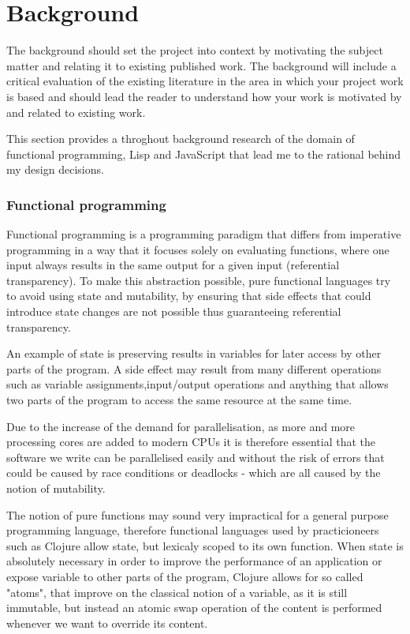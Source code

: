 \chapter{Background}
The background should set the project into context by motivating the subject matter and relating it to existing published work. The background will include a critical evaluation of the existing literature in the area in which your project work is based and should lead the reader to understand how your work is motivated by and related to existing work.

This section provides a throghout background research of the domain of functional programming, Lisp and JavaScript that lead me to the rational behind my design decisions.

\subsection{Functional programming}
Functional programming is a programming paradigm that differs from imperative programming in a way that it focuses solely on evaluating functions, where one input always results in the same output for a given input (referential transparency). To make this abstraction possible, pure functional languages try to avoid using state and mutability, by ensuring that side effects that could introduce state changes are not possible thus guaranteeing referential transparency.

An example of state is preserving results in variables for later access by other parts of the program. A side effect may result from many different operations such as variable assignments,input/output operations and anything that allows two parts of the program to access the same resource at the same time.

Due to the increase of the demand for parallelisation, as more and more processing cores are added to modern CPUs it is therefore essential that the software we write can be parallelised easily and without the risk of errors that could be caused by race conditions or deadlocks - which are all caused by the notion of mutability. 

The notion of pure functions may sound very impractical for a general purpose programming language, therefore functional languages used by practicioneers such as Clojure allow state, but lexicaly scoped to its own function. 
When state is absolutely necessary in order to improve the performance of an application or expose variable to other parts of the program, Clojure allows for so called "atoms", that improve on the classical notion of a variable, as it is still immutable, but instead an atomic swap operation of the content is performed whenever we want to override its content.

